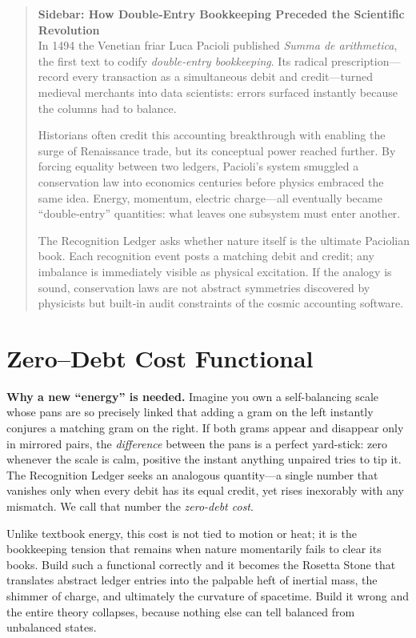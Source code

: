 \documentclass[11pt]{article}
\begin{document}
\begin{quote}
\small
\textbf{Sidebar: How Double‐Entry Bookkeeping Preceded the Scientific Revolution}\\[4pt]
In 1494 the Venetian friar Luca Pacioli published \emph{Summa de arithmetica}, the first text to codify \emph{double‐entry bookkeeping}.  Its radical prescription—record every transaction as a simultaneous debit and credit—turned medieval merchants into data scientists: errors surfaced instantly because the columns had to balance.

Historians often credit this accounting breakthrough with enabling the surge of Renaissance trade, but its conceptual power reached further.  By forcing equality between two ledgers, Pacioli’s system smuggled a conservation law into economics centuries before physics embraced the same idea.  Energy, momentum, electric charge—all eventually became “double‐entry” quantities: what leaves one subsystem must enter another.

The Recognition Ledger asks whether nature itself is the ultimate Paciolian book.  Each recognition event posts a matching debit and credit; any imbalance is immediately visible as physical excitation.  If the analogy is sound, conservation laws are not abstract symmetries discovered by physicists but built‐in audit constraints of the cosmic accounting software.
\end{quote}

\section{Zero–Debt Cost Functional}
\label{sec:zero-debt}
\noindent
\textbf{Why a new “energy” is needed.}  
Imagine you own a self-balancing scale whose pans are so precisely linked that adding a gram on the left instantly conjures a matching gram on the right.  If both grams appear and disappear only in mirrored pairs, the \emph{difference} between the pans is a perfect yard-stick: zero whenever the scale is calm, positive the instant anything unpaired tries to tip it.  The Recognition Ledger seeks an analogous quantity—a single number that vanishes only when every debit has its equal credit, yet rises inexorably with any mismatch.  We call that number the \emph{zero-debt cost}.

Unlike textbook energy, this cost is not tied to motion or heat; it is the bookkeeping tension that remains when nature momentarily fails to clear its books.  Build such a functional correctly and it becomes the Rosetta Stone that translates abstract ledger entries into the palpable heft of inertial mass, the shimmer of charge, and ultimately the curvature of spacetime.  Build it wrong and the entire theory collapses, because nothing else can tell balanced from unbalanced states.
\end{document}
